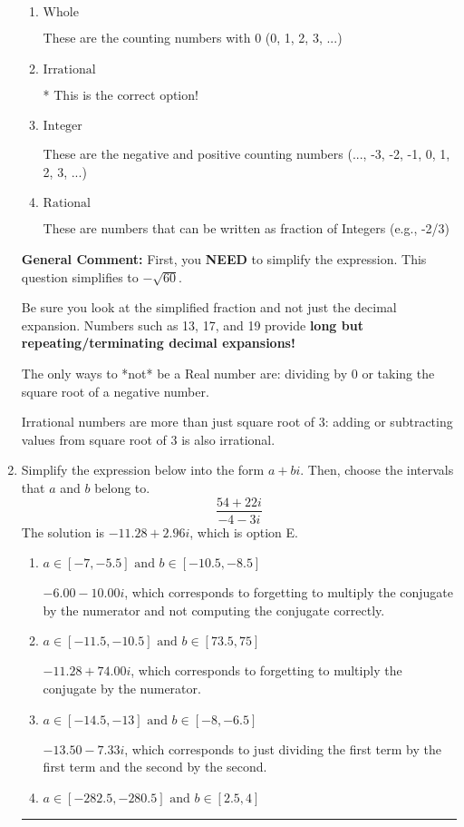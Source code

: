 \documentclass{extbook}[14pt]
\newcommand{\litem}[1]{\item #1

\rule{\textwidth}{0.4pt}}
\begin{document}
\begin{enumerate}
{\begin{enumerate}[label=\Alph*.]
These are Nonreal Complex numbers \textbf{OR} things that are not numbers (e.g., dividing by 0).
\item \( \text{Whole} \)

These are the counting numbers with 0 (0, 1, 2, 3, ...)
\item \( \text{Irrational} \)

* This is the correct option!
\item \( \text{Integer} \)

These are the negative and positive counting numbers (..., -3, -2, -1, 0, 1, 2, 3, ...)
\item \( \text{Rational} \)

These are numbers that can be written as fraction of Integers (e.g., -2/3)
\end{enumerate}

\textbf{General Comment:} First, you \textbf{NEED} to simplify the expression. This question simplifies to $-\sqrt{60}$. 
 
 Be sure you look at the simplified fraction and not just the decimal expansion. Numbers such as 13, 17, and 19 provide \textbf{long but repeating/terminating decimal expansions!} 
 
 The only ways to *not* be a Real number are: dividing by 0 or taking the square root of a negative number. 
 
 Irrational numbers are more than just square root of 3: adding or subtracting values from square root of 3 is also irrational.
}
\litem{
Simplify the expression below into the form $a+bi$. Then, choose the intervals that $a$ and $b$ belong to.
\[ \frac{54 + 22 i}{-4 - 3 i} \]
The solution is \( -11.28  + 2.96 i \), which is option E.\begin{enumerate}[label=\Alph*.]
\item \( a \in [-7, -5.5] \text{ and } b \in [-10.5, -8.5] \)

 $-6.00  - 10.00 i$, which corresponds to forgetting to multiply the conjugate by the numerator and not computing the conjugate correctly.
\item \( a \in [-11.5, -10.5] \text{ and } b \in [73.5, 75] \)

 $-11.28  + 74.00 i$, which corresponds to forgetting to multiply the conjugate by the numerator.
\item \( a \in [-14.5, -13] \text{ and } b \in [-8, -6.5] \)

 $-13.50  - 7.33 i$, which corresponds to just dividing the first term by the first term and the second by the second.
\item \( a \in [-282.5, -280.5] \text{ and } b \in [2.5, 4] \)


\end{enumerate}}
\end{enumerate}
\end{document}
